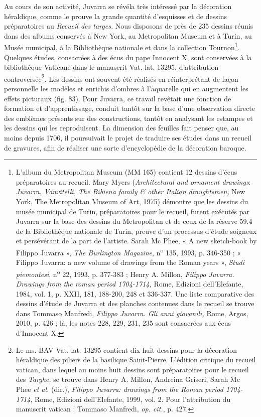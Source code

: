 \documentclass[12pt,twoside,openany]{book}
\begin{document}
Au cours de son activité, Juvarra se révéla très intéressé par la décoration héraldique, comme le prouve la grande quantité d’esquisses et de dessins préparatoires au \textit{Recueil des targes.} Nous disposons de près de 235 dessins réunis dans des albums conservés à New York, au Metropolitan Museum et à Turin, au Musée municipal, à la Bibliothèque nationale et dans la collection Tournon\footnote{L’album du Metropolitan Museum (MM 165) contient 12 dessins d’écus préparatoires au recueil. Mary Myers (\textit{Architectural and ornament drawings}: \textit{Juvarra, Vanvitelli, The Bibiena family \& other Italian draughtsmen, }New York, The Metropolitan Museum of Art, 1975) démontre que les dessins du musée municipal de Turin, préparatoires pour le recueil, furent exécutés par Juvarra sur la base des dessins du Metropolitan et de ceux de la réserve 59.4 de la Bibliothèque nationale de Turin, preuve d’un processus d’étude soigneux et persévérant de la part de l’artiste. Sarah Mc Phee, « A new sketch-book by Filippo Juvarra », \textit{The Burlington Magazine}, n\textsuperscript{o} 135, 1993, p. 346-350 ; « Filippo Juvarra: a new volume of drawings from the Roman years », \textit{Studi piemontesi}, n\textsuperscript{o} 22, 1993, p. 377-383 ; Henry A. Millon, \textit{Filippo Juvarra. Drawings from the roman period 1704-1714, }Rome, Edizioni dell’Elefante, 1984, vol. 1, p. XXII, 181, 188-200, 248 et 336-337. Une liste comparative des dessins d’étude de Juvarra et des planches contenues dans le recueil se trouve dans Tommaso Manfredi, \textit{Filippo Juvarra. Gli anni giovanili, }Rome, Argos, 2010, p. 426 ; là, les notes 228, 229, 231, 235 sont consacrées aux écus d’Innocent X.}. Quelques études, consacrées à des écus du pape Innocent X, sont conservées à la bibliothèque Vaticane dans le manuscrit Vat. lat. 13295, d’attribution controversée\footnote{Le ms. BAV Vat. lat. 13295 contient dix-huit dessins pour la décoration héraldique des piliers de la basilique Saint-Pierre. L’édition critique du recueil vatican, dans lequel au moins huit dessins sont préparatoires pour le recueil des \textit{Targhe,} se trouve dans Henry A. Millon, Andreina Griseri, Sarah Mc Phee \textit{et al.} (dir.), \textit{Filippo Juvarra: drawings from the Roman period 1704-1714}, Rome, Edizioni dell’Elefante, 1999, vol. 2. Pour l’attribution du manuscrit vatican : Tommaso Manfredi, \textit{op. cit.}, p. 427.}. Les dessins ont souvent été réalisés en réinterprétant de façon personnelle les modèles et enrichis d’ombres à l’aquarelle qui en augmentent les effets picturaux (fig. 83). Pour Juvarra, ce travail revêtait une fonction de formation et d’apprentissage, conduit tantôt sur la base d’une observation directe des emblèmes présents sur des constructions, tantôt en analysant les estampes et les dessins qui les reproduisent. La dimension des feuilles fait penser que, au moins depuis 1706, il poursuivait le projet de traduire ses études dans un recueil de gravures, afin de réaliser une sorte d’encyclopédie de la décoration baroque.
\end{document}
